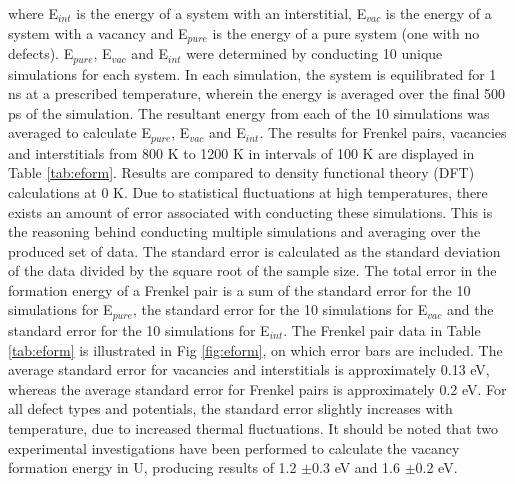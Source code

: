 \documentclass[review]{elsarticle}
\begin{document}
where E$_{int}$ is the energy of a system with an interstitial, E$_{vac}$ is the energy of a system with a vacancy and E$_{pure}$ is the energy of a pure system (one with no defects). E$_{pure}$, E$_{vac}$ and E$_{int}$ were determined by conducting 10 unique simulations for each system. In each simulation, the system is equilibrated for 1 ns at a prescribed temperature, wherein the energy is averaged over the final 500 ps of the simulation. The resultant energy from each of the 10 simulations was averaged to calculate E$_{pure}$, E$_{vac}$ and E$_{int}$. The results for Frenkel pairs, vacancies and interstitials from 800 K to 1200 K in intervals of 100 K are displayed in Table \ref{tab:eform}. Results are compared to density functional theory (DFT) calculations at 0 K. Due to statistical fluctuations at high temperatures, there exists an amount of error associated with conducting these simulations. This is the reasoning behind conducting multiple simulations and averaging over the produced set of data. The standard error is calculated as the standard deviation of the data divided by the square root of the sample size. The total error in the formation energy of a Frenkel pair is a sum of the standard error for the 10 simulations for E$_{pure}$, the standard error for the 10 simulations for E$_{vac}$ and the standard error for the 10 simulations for E$_{int}$. The Frenkel pair data in Table \ref{tab:eform} is illustrated in Fig \ref{fig:eform}, on which error bars are included. The average standard error for vacancies and interstitials is approximately 0.13 eV, whereas the average standard error for Frenkel pairs is approximately 0.2 eV. For all defect types and potentials, the standard error slightly increases with temperature, due to increased thermal fluctuations. It should be noted that two experimental investigations have been performed to calculate the vacancy formation energy in U, producing results of 1.2 $\pm$0.3 eV\cite{matter1980} and 1.6 $\pm$0.2 eV\cite{lund2013}.
\end{document}
